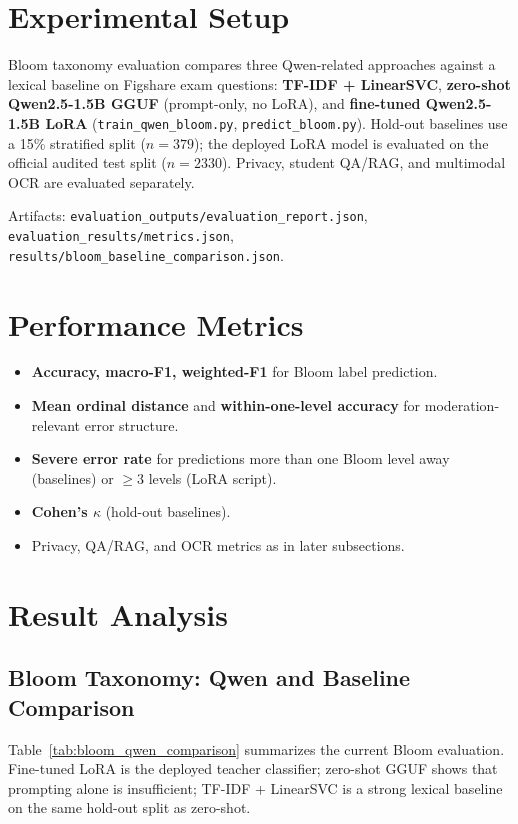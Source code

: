 \section{Experimental Setup}

Bloom taxonomy evaluation compares three Qwen-related approaches against a lexical baseline on Figshare exam questions: \textbf{TF-IDF + LinearSVC}, \textbf{zero-shot Qwen2.5-1.5B GGUF} (prompt-only, no LoRA), and \textbf{fine-tuned Qwen2.5-1.5B LoRA} (\texttt{train\_qwen\_bloom.py}, \texttt{predict\_bloom.py}). Hold-out baselines use a 15\% stratified split ($n{=}379$); the deployed LoRA model is evaluated on the official audited test split ($n{=}2330$). Privacy, student QA/RAG, and multimodal OCR are evaluated separately.

Artifacts: \texttt{evaluation\_outputs/evaluation\_report.json}, \texttt{evaluation\_results/metrics.json}, \texttt{results/bloom\_baseline\_comparison.json}.

\section{Performance Metrics}

\begin{itemize}
    \item \textbf{Accuracy, macro-F1, weighted-F1} for Bloom label prediction.
    \item \textbf{Mean ordinal distance} and \textbf{within-one-level accuracy} for moderation-relevant error structure.
    \item \textbf{Severe error rate} for predictions more than one Bloom level away (baselines) or $\geq 3$ levels (LoRA script).
    \item \textbf{Cohen's $\kappa$} (hold-out baselines).
    \item Privacy, QA/RAG, and OCR metrics as in later subsections.
\end{itemize}

\section{Result Analysis}

\subsection{Bloom Taxonomy: Qwen and Baseline Comparison}

Table~\ref{tab:bloom_qwen_comparison} summarizes the current Bloom evaluation. Fine-tuned LoRA is the deployed teacher classifier; zero-shot GGUF shows that prompting alone is insufficient; TF-IDF + LinearSVC is a strong lexical baseline on the same hold-out split as zero-shot.

